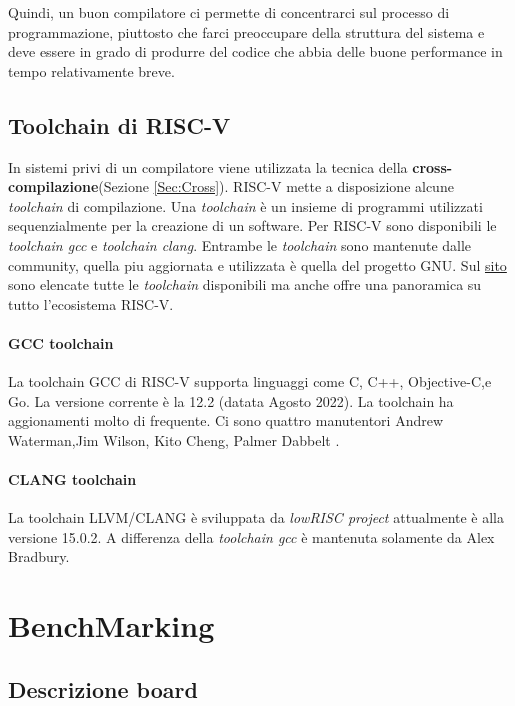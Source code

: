 \documentclass[12pt,a4paper]{report}
\begin{document}
Quindi, un buon compilatore ci permette di concentrarci sul processo di programmazione,  piuttosto che farci preoccupare della struttura del sistema e deve essere in grado di produrre del codice che abbia delle buone performance in tempo relativamente breve.


\section{Toolchain di RISC-V}
In sistemi privi di un compilatore viene utilizzata la tecnica della \textbf{cross-compilazione}(Sezione \ref{Sec:Cross}).  RISC-V mette a disposizione alcune \textit{toolchain} di compilazione. Una \textit{toolchain} è un insieme di programmi utilizzati sequenzialmente per la creazione di un software. Per RISC-V sono disponibili le \textit{toolchain gcc}\cite{toolchain_gcc} e \textit{toolchain clang}\cite{toolchain_clang}. Entrambe le \textit{toolchain} sono mantenute dalle community, quella piu aggiornata e utilizzata è quella del progetto GNU.  Sul \href{https://wiki.riscv.org/display/HOME/RISC-V+Software+Ecosystem}{sito} sono elencate tutte le \textit{toolchain} disponibili ma anche offre una panoramica su tutto l'ecosistema RISC-V.


\subsubsection{GCC toolchain}
La toolchain GCC di RISC-V supporta linguaggi come C, C++, Objective-C,e Go. La versione corrente è la 12.2 (datata Agosto 2022).  La toolchain ha aggionamenti molto di frequente.  Ci sono quattro manutentori Andrew Waterman,Jim Wilson, Kito Cheng, Palmer Dabbelt .

\subsubsection{CLANG toolchain}
La toolchain LLVM/CLANG è sviluppata da \textit{lowRISC project} attualmente è alla versione 15.0.2. A differenza della \textit{toolchain gcc} è mantenuta solamente da Alex Bradbury.



\chapter{BenchMarking}
\section{Descrizione board}
\end{document}
